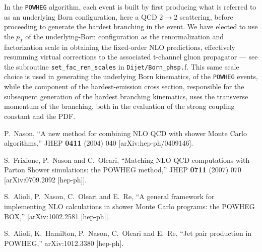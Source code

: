 \documentclass[paper]{JHEP3}
\newcommand\POWHEG{{\tt POWHEG}}
\begin{document}
In the \POWHEG{} algorithm, each event is built by first producing
what is referred to as an underlying Born configuration, here a QCD
$2\rightarrow2$ scattering, before proceeding to generate the hardest
branching in the event. We have elected to use the $p_{T}$ of the
underlying-Born configuration as the renormalization and factorization
scale in obtaining the fixed-order NLO predictions, effectively resumming
virtual corrections to the associated t-channel gluon propagator ---
see the subroutine \texttt{set\_fac\_ren\_scales} in \texttt{Dijet/Born\_phsp.}f.
This same scale choice is used in generating the underlying Born kinematics,
of the \POWHEG{} events, while the component of the hardest-emission
cross section, responsible for the subsequent generation of the hardest
branching kinematics, uses the transverse momentum of the branching,
both in the evaluation of the strong coupling constant and the PDF. 



\begin{thebibliography}{10}


  P.~Nason,
  ``A new method for combining NLO QCD with shower Monte Carlo algorithms,''
  JHEP {\bf 0411} (2004) 040
  [arXiv:hep-ph/0409146].

  S.~Frixione, P.~Nason and C.~Oleari,
``Matching NLO QCD computations with Parton Shower simulations: the POWHEG
method,''
  JHEP {\bf 0711} (2007) 070
  [arXiv:0709.2092 [hep-ph]].

  S.~Alioli, P.~Nason, C.~Oleari and E.~Re,
``A general framework for implementing NLO calculations in shower Monte Carlo
  programs: the POWHEG BOX,''
  [arXiv:1002.2581 [hep-ph]].

  S.~Alioli, K.~Hamilton, P.~Nason, C.~Oleari and E.~Re,
  ``Jet pair production in POWHEG,''
  arXiv:1012.3380 [hep-ph].


\end{thebibliography}
\end{document}
